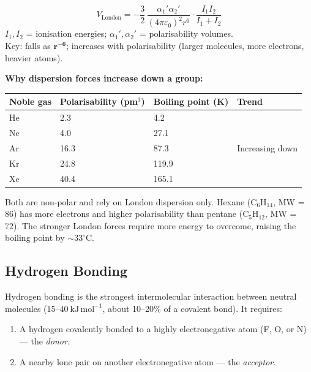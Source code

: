 \documentclass[12pt,a4paper]{article}
\begin{document}
\begin{tcolorbox}[formulabox, title={London Dispersion Energy}]
\[
V_{\mathrm{London}} = -\frac{3}{2}\,\frac{\alpha_1'\alpha_2'}{(4\pi\varepsilon_0)^2 r^6}\cdot\frac{I_1 I_2}{I_1+I_2}
\]
$I_1, I_2$ = ionisation energies; $\alpha_1', \alpha_2'$ = polarisability volumes.\\
Key: falls as $\boldsymbol{r^{-6}}$; increases with polarisability (larger molecules, more electrons, heavier atoms).
\end{tcolorbox}

\textbf{Why dispersion forces increase down a group:}

\begin{tabularx}{\linewidth}{|B{2.4cm}|Y|Y|Y|}
\hline
\textbf{Noble gas} & \textbf{Polarisability (pm$^3$)} & \textbf{Boiling point (K)} & \textbf{Trend} \\
\hline
He & 2.3 & 4.2 & \\
\hline
Ne & 4.0 & 27.1 & \\
\hline
Ar & 16.3 & 87.3 & Increasing down \\
\hline
Kr & 24.8 & 119.9 & \\
\hline
Xe & 40.4 & 165.1 & \\
\hline
\end{tabularx}

\begin{tcolorbox}[examplebox, title={Solved Example: Why Hexane Boils at 69$^\circ$C but Pentane at 36$^\circ$C}]
Both are non-polar and rely on London dispersion only. Hexane ($\mathrm{C_6H_{14}}$, MW = 86) has more electrons and higher polarisability than pentane ($\mathrm{C_5H_{12}}$, MW = 72). The stronger London forces require more energy to overcome, raising the boiling point by $\sim33^\circ\mathrm{C}$.
\end{tcolorbox}

\subsection{Hydrogen Bonding}
Hydrogen bonding is the strongest intermolecular interaction between neutral molecules ($15$--$40\ \mathrm{kJ\,mol^{-1}}$, about 10--20\% of a covalent bond). It requires:
\begin{enumerate}[leftmargin=*, itemsep=1pt, topsep=2pt]
  \item A hydrogen covalently bonded to a highly electronegative atom (F, O, or N) --- the \emph{donor}.
  \item A nearby lone pair on another electronegative atom --- the \emph{acceptor}.
\end{enumerate}
\end{document}
